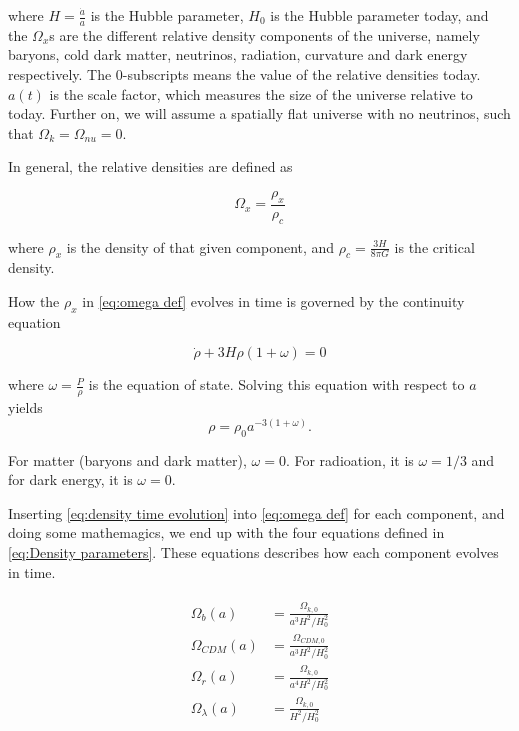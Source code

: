 \documentclass[12pt]{article}
\begin{document}
where $H=\frac{\dot{a}}{a}$ is the Hubble parameter, $H_0$ is the Hubble parameter today, and the $\Omega_{x}$s are the different relative density components of the universe, namely baryons, cold dark matter, neutrinos, radiation, curvature and dark energy respectively. The 0-subscripts means the value of the relative densities today.  $a(t)$ is the scale factor, which measures the size of the universe relative to today. Further on, we will assume a spatially flat universe with no neutrinos, such that $\Omega_k = \Omega_{nu} = 0$.

In general, the relative densities are defined as 

\begin{equation}\label{eq:omega def}
    \Omega_x = \frac{\rho_x}{\rho_c}
\end{equation}

where $\rho_x$ is the density of that given component, and $\rho_c = \frac{3H}{8\pi G}$ is the critical density. 

How the $\rho_x$ in \cref{eq:omega def} evolves in time is governed by the continuity equation 

\begin{equation}
    \dot{\rho} + 3H\rho(1 + \omega) = 0
\end{equation}

where $\omega = \frac{P}{\rho}$ is the equation of state. Solving this equation with respect to $a$ yields 
\begin{equation}\label{eq:density time evolution}
\rho = \rho_0 a^{-3(1+\omega)}.
\end{equation}

For matter (baryons and dark matter), $\omega = 0$. For radioation, it is $\omega = 1/3$ and for dark energy, it is $\omega = 0$. 

Inserting \cref{eq:density time evolution} into \cref{eq:omega def} for each component, and doing some mathemagics, we end up with the four equations defined in \cref{eq:Density parameters}. These equations describes how each component evolves in time. 

\begin{align}\label{eq:Density parameters}
    \begin{split}
    \Omega_b(a) &= \frac{\Omega_{k,0}}{a^3 H^2/H_0^2}  \\
    \Omega_{CDM}(a) &= \frac{\Omega_{CDM,0}}{a^3 H^2/H_0^2}  \\
    \Omega_r(a) &= \frac{\Omega_{k,0}}{a^4 H^2/H_0^2}  \\
    \Omega_{\lambda}(a) &= \frac{\Omega_{k,0}}{H^2/H_0^2} 
    \end{split}
\end{align}
\end{document}
